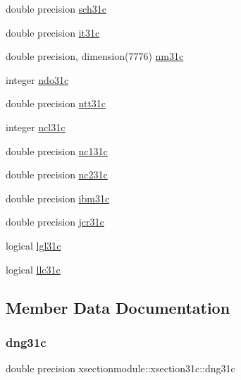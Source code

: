 \begin{DoxyCompactItemize}
\item 
double precision \hyperlink{structxsectionmodule_1_1xsection31c_a7ffdcc65971e24cef95e0c9c8878095b}{sch31c}
\item 
double precision \hyperlink{structxsectionmodule_1_1xsection31c_a38fcaff8deb8606201ed8efcd6b246d4}{it31c}
\item 
double precision, dimension(7776) \hyperlink{structxsectionmodule_1_1xsection31c_ab601ddf887d780dea0bcaf77284d841c}{nm31c}
\item 
integer \hyperlink{structxsectionmodule_1_1xsection31c_a6b85824d84e92d65699e393adf26ea8c}{ndo31c}
\item 
double precision \hyperlink{structxsectionmodule_1_1xsection31c_a9cf83b769cc15b796a82257ee1bfaee1}{ntt31c}
\item 
integer \hyperlink{structxsectionmodule_1_1xsection31c_a0e1a204c4c6ffec87eab4d79daacf65b}{ncl31c}
\item 
double precision \hyperlink{structxsectionmodule_1_1xsection31c_aaf75ef6dd4a3ffefd6e1ff840b5b4dc0}{nc131c}
\item 
double precision \hyperlink{structxsectionmodule_1_1xsection31c_a9544d3982e0a79131dfbffaee1c73987}{nc231c}
\item 
double precision \hyperlink{structxsectionmodule_1_1xsection31c_a86f9e10a50a3d1b5709d709c09c958c3}{ibm31c}
\item 
double precision \hyperlink{structxsectionmodule_1_1xsection31c_a136ca41800028a5ea1a7d82a9323bdae}{jcr31c}
\item 
logical \hyperlink{structxsectionmodule_1_1xsection31c_a2175d8b0251b4e1ff23c3f6c40811863}{lgl31c}
\item 
logical \hyperlink{structxsectionmodule_1_1xsection31c_ac3f7f8c35e7ae273c782868c57cefa32}{llc31c}
\end{DoxyCompactItemize}


\subsection{Member Data Documentation}
\mbox{\label{structxsectionmodule_1_1xsection31c_a0257fa78071d428ca6ad6df960294783}} 
\subsubsection{\texorpdfstring{dng31c}{dng31c}}
{\footnotesize\ttfamily double precision xsectionmodule\+::xsection31c\+::dng31c}

